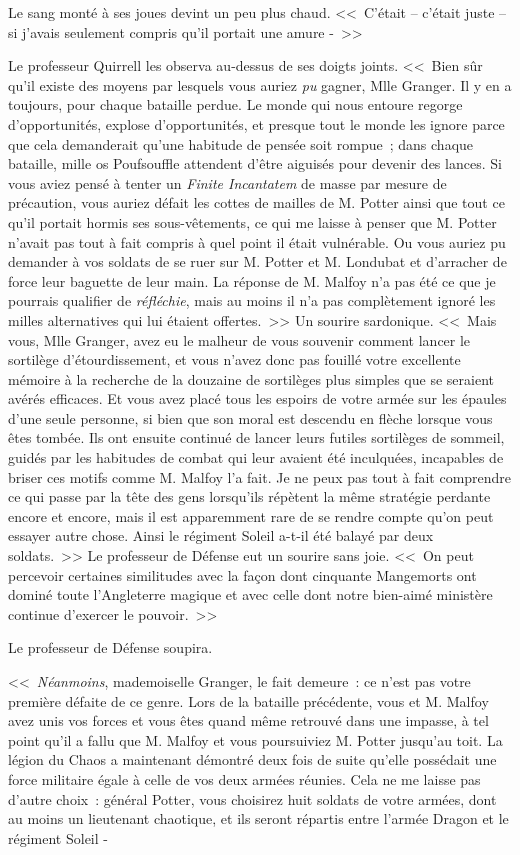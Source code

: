 Le sang monté à ses joues devint un peu plus chaud. <<~C'était -- c'était juste -- si j'avais seulement compris qu'il portait une amure -~>>

Le professeur Quirrell les observa au-dessus de ses doigts joints. <<~Bien sûr qu'il existe des moyens par lesquels vous auriez \emph{pu} gagner, Mlle Granger. Il y en a toujours, pour chaque bataille perdue. Le monde qui nous entoure regorge d'opportunités, explose d'opportunités, et presque tout le monde les ignore parce que cela demanderait qu'une habitude de pensée soit rompue~; dans chaque bataille, mille os Poufsouffle attendent d'être aiguisés pour devenir des lances. Si vous aviez pensé à tenter un \emph{Finite Incantatem} de masse par mesure de précaution, vous auriez défait les cottes de mailles de M. Potter ainsi que tout ce qu'il portait hormis ses sous-vêtements, ce qui me laisse à penser que M. Potter n'avait pas tout à fait compris à quel point il était vulnérable. Ou vous auriez pu demander à vos soldats de se ruer sur M. Potter et M. Londubat et d'arracher de force leur baguette de leur main. La réponse de M. Malfoy n'a pas été ce que je pourrais qualifier de \emph{réfléchie}, mais au moins il n'a pas complètement ignoré les milles alternatives qui lui étaient offertes.~>> Un sourire sardonique. <<~Mais vous, Mlle Granger, avez eu le malheur de vous souvenir comment lancer le sortilège d'étourdissement, et vous n'avez donc pas fouillé votre excellente mémoire à la recherche de la douzaine de sortilèges plus simples que se seraient avérés efficaces. Et vous avez placé tous les espoirs de votre armée sur les épaules d'une seule personne, si bien que son moral est descendu en flèche lorsque vous êtes tombée. Ils ont ensuite continué de lancer leurs futiles sortilèges de sommeil, guidés par les habitudes de combat qui leur avaient été inculquées, incapables de briser ces motifs comme M. Malfoy l'a fait. Je ne peux pas tout à fait comprendre ce qui passe par la tête des gens lorsqu'ils répètent la même stratégie perdante encore et encore, mais il est apparemment rare de se rendre compte qu'on peut essayer autre chose. Ainsi le régiment Soleil a-t-il été balayé par deux soldats.~>> Le professeur de Défense eut un sourire sans joie. <<~On peut percevoir certaines similitudes avec la façon dont cinquante Mangemorts ont dominé toute l'Angleterre magique et avec celle dont notre bien-aimé ministère continue d'exercer le pouvoir.~>>

Le professeur de Défense soupira.

<<~\emph{Néanmoins}, mademoiselle Granger, le fait demeure~: ce n'est pas votre première défaite de ce genre. Lors de la bataille précédente, vous et M. Malfoy avez unis vos forces et vous êtes quand même retrouvé dans une impasse, à tel point qu'il a fallu que M. Malfoy et vous poursuiviez M. Potter jusqu'au toit. La légion du Chaos a maintenant démontré deux fois de suite qu'elle possédait une force militaire égale à celle de vos deux armées réunies. Cela ne me laisse pas d'autre choix~: général Potter, vous choisirez huit soldats de votre armées, dont au moins un lieutenant chaotique, et ils seront répartis entre l'armée Dragon et le régiment Soleil -

